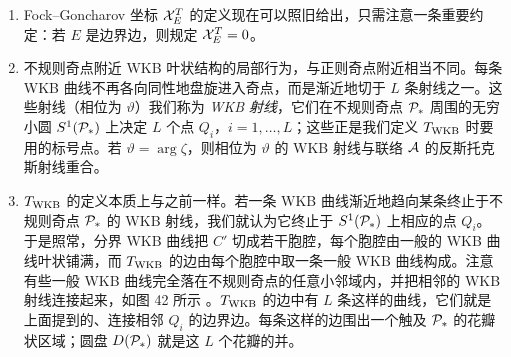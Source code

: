 \begin{enumerate}
\item Fock–Goncharov 坐标 $\mathcal{X}_E^T$ 的定义现在可以照旧给出，只需注意一条重要约定：若 $E$ 是边界边，则规定 $\mathcal{X}_E^T = 0$。

\item 不规则奇点附近 WKB 叶状结构的局部行为，与正则奇点附近相当不同。每条 WKB 曲线不再各向同性地盘旋进入奇点，而是渐近地切于 $L$ 条射线之一。这些射线（相位为 $\vartheta$）我们称为 \emph{WKB 射线}，它们在不规则奇点 $\mathcal{P}_*$ 周围的无穷小圆 $S^1(\mathcal{P}_*)$ 上决定 $L$ 个点 $Q_i$，$i=1, \dots, L$；这些正是我们定义 $T_{\rm WKB}$ 时要用的标号点。若 $\vartheta = \arg \zeta$，则相位为 $\vartheta$ 的 WKB 射线与联络 $\mathcal{A}$ 的反斯托克斯射线重合。

\item $T_{\rm WKB}$ 的定义本质上与之前一样。若一条 WKB 曲线渐近地趋向某条终止于不规则奇点 $\mathcal{P}_*$ 的 WKB 射线，我们就认为它终止于 $S^1(\mathcal{P}_*)$ 上相应的点 $Q_i$。于是照常，分界 WKB 曲线把 $C'$ 切成若干胞腔，每个胞腔由一般的 WKB 曲线叶状铺满，而 $T_{\rm WKB}$ 的边由每个胞腔中取一条一般 WKB 曲线构成。注意有些一般 WKB 曲线完全落在不规则奇点的任意小邻域内，并把相邻的 WKB 射线连接起来，如图 42 所示%
。$T_{\rm WKB}$ 的边中有 $L$ 条这样的曲线，它们就是上面提到的、连接相邻 $Q_i$ 的边界边。每条这样的边围出一个触及 $\mathcal{P}_*$ 的花瓣状区域；圆盘 $D(\mathcal{P}_*)$ 就是这 $L$ 个花瓣的并。


\end{enumerate}
